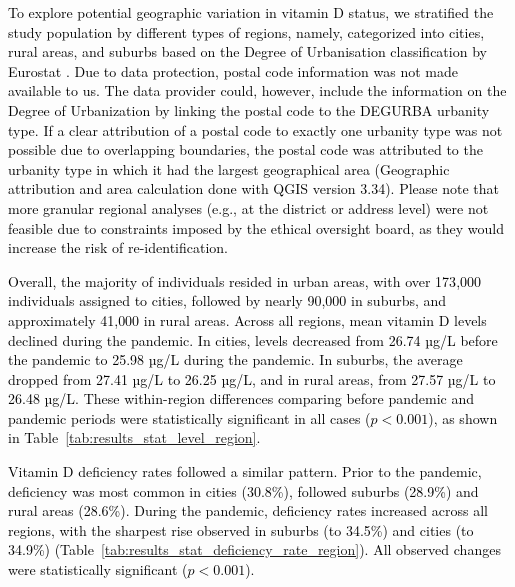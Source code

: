 \documentclass[12pt]{article}
\newcommand{\REV}[1]{\textcolor{black}{#1}}
\begin{document}
\begin{appendices}
\REV{To explore potential geographic variation in vitamin D status, we stratified the study population by different types of regions, namely, categorized into cities, rural areas, and suburbs based on the Degree of Urbanisation classification by Eurostat \cite{eurostat_degurb_gisco}. Due to data protection, postal code information was not made available to us. The data provider could, however, include the information on the Degree of Urbanization by linking the postal code to the DEGURBA urbanity type. If a clear attribution of a postal code to exactly one urbanity type was not possible due to overlapping boundaries, the postal code was attributed to the urbanity type in which it had the largest geographical area (Geographic attribution and area calculation done with QGIS version 3.34).  Please note that more granular regional analyses (e.g., at the district or address level) were not feasible due to constraints imposed by the ethical oversight board, as they would increase the risk of re-identification.}

\REV{Overall, the majority of individuals resided in urban areas, with over 173{,}000 individuals assigned to cities, followed by nearly 90{,}000 in suburbs, and approximately 41{,}000 in rural areas. Across all regions, mean vitamin D levels declined during the pandemic. In cities, levels decreased from 26.74 µg/L before the pandemic to 25.98 µg/L during the pandemic. In suburbs, the average dropped from 27.41 µg/L to 26.25 µg/L, and in rural areas, from 27.57 µg/L to 26.48 µg/L. These within-region differences comparing before pandemic and pandemic periods were statistically significant in all cases ($p < 0.001$), as shown in Table~\ref{tab:results_stat_level_region}.}

\REV{Vitamin D deficiency rates followed a similar pattern. Prior to the pandemic, deficiency was most common in cities (30.8\%), followed suburbs (28.9\%) and rural areas (28.6\%). During the pandemic, deficiency rates increased across all regions, with the sharpest rise observed in suburbs (to 34.5\%) and cities (to 34.9\%) (Table~\ref{tab:results_stat_deficiency_rate_region}). All observed changes were statistically significant ($p < 0.001$).}



\newpage


\end{appendices}
\end{document}
